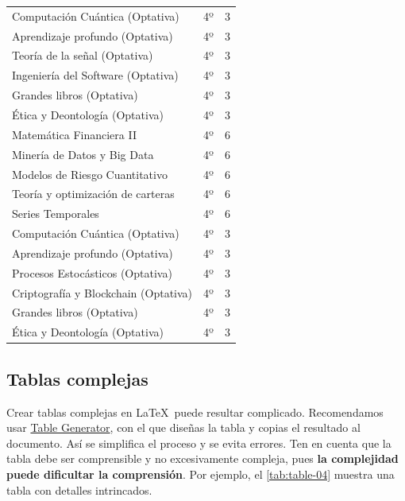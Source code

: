 \begin{longtable}[c]{lcc}
Computación Cuántica (Optativa) & 4º & 3 \\
Aprendizaje profundo (Optativa) & 4º & 3 \\
Teoría de la señal (Optativa) & 4º & 3 \\
Ingeniería del Software (Optativa) & 4º & 3 \\
Grandes libros (Optativa) & 4º & 3 \\
Ética y Deontología (Optativa) & 4º & 3 \\

Matemática Financiera II & 4º & 6 \\
Minería de Datos y Big Data & 4º & 6 \\
Modelos de Riesgo Cuantitativo & 4º & 6 \\
Teoría y optimización de carteras & 4º & 6 \\
Series Temporales & 4º & 6 \\

Computación Cuántica (Optativa) & 4º & 3 \\
Aprendizaje profundo (Optativa) & 4º & 3 \\
Procesos Estocásticos (Optativa) & 4º & 3 \\
Criptografía y Blockchain (Optativa) & 4º & 3 \\
Grandes libros (Optativa) & 4º & 3 \\
Ética y Deontología (Optativa) & 4º & 3 \\

\end{longtable}

\subsection{Tablas complejas}

Crear tablas complejas en \LaTeX\ puede resultar complicado. Recomendamos usar \href{https://www.tablesgenerator.com/}{Table Generator}, con el que diseñas la tabla y copias el resultado al documento. Así se simplifica el proceso y se evita errores. Ten en cuenta que la tabla debe ser comprensible y no excesivamente compleja, pues \textbf{la complejidad puede dificultar la comprensión}. Por ejemplo, el \autoref{tab:table-04} muestra una tabla con detalles intrincados.

